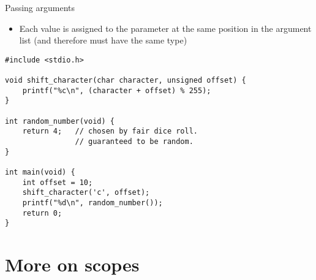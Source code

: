 \begin{frame}[fragile]{Passing arguments}
	\begin{itemize}
		\item Each value is assigned to the parameter at the same position in the argument list (and therefore must have the same type)
	\end{itemize}		
	\begin{lstlisting}[basicstyle=\scriptsize]
#include <stdio.h>	
	
void shift_character(char character, unsigned offset) {
	printf("%c\n", (character + offset) % 255);
}

int random_number(void) {
	return 4;	// chosen by fair dice roll.
				// guaranteed to be random.
}

int main(void) {
	int offset = 10;
	shift_character('c', offset);
	printf("%d\n", random_number());
	return 0;
}
\end{lstlisting}
\end{frame}

\section{More on scopes}
